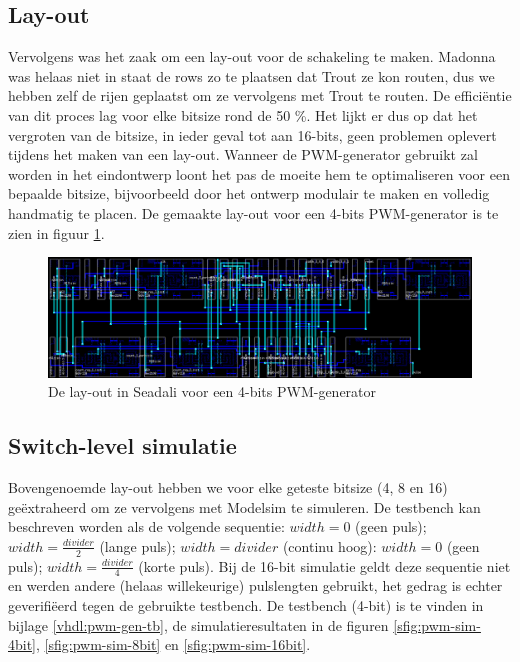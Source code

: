 \documentclass{article}
\begin{document}
\subsection{Lay-out}
\label{ssec:pwm-impl-layout}
Vervolgens was het zaak om een lay-out voor de schakeling te maken. Madonna was helaas niet in staat de rows zo te plaatsen dat Trout ze kon routen, dus we hebben zelf de rijen geplaatst om ze vervolgens met Trout te routen. De efficiëntie van dit proces lag voor elke bitsize rond de 50 \%. Het lijkt er dus op dat het vergroten van de bitsize, in ieder geval tot aan 16-bits, geen problemen oplevert tijdens het maken van een lay-out. Wanneer de PWM-generator gebruikt zal worden in het eindontwerp loont het pas de moeite hem te optimaliseren voor een bepaalde bitsize, bijvoorbeeld door het ontwerp modulair te maken en volledig handmatig te placen.
De gemaakte lay-out voor een 4-bits PWM-generator is te zien in figuur \ref{fig:pwm-layout}.

\begin{figure}[H]
	\centering
	\includegraphics[width=\textwidth]{resource/pwm_gen_layout.png}
	\caption{De lay-out in Seadali voor een 4-bits PWM-generator}
	\label{fig:pwm-layout}
\end{figure}

\subsection{Switch-level simulatie}
\label{ssec:pwm-impl-switch}
Bovengenoemde lay-out hebben we voor elke geteste bitsize (4, 8 en 16) geëxtraheerd om ze vervolgens met Modelsim te simuleren. De testbench kan beschreven worden als de volgende sequentie: $width = 0$ (geen puls); $width = \frac{divider}{2}$ (lange puls); $width = divider$ (continu hoog): $width = 0$ (geen puls); $width = \frac{divider}{4}$ (korte puls). Bij de 16-bit simulatie geldt deze sequentie niet en werden andere (helaas willekeurige) pulslengten gebruikt, het gedrag is echter geverifiëerd tegen de gebruikte testbench.
De testbench (4-bit) is te vinden in bijlage \ref{vhdl:pwm-gen-tb}, de simulatieresultaten in de figuren \ref{sfig:pwm-sim-4bit}, \ref{sfig:pwm-sim-8bit} en \ref{sfig:pwm-sim-16bit}.
\end{document}
